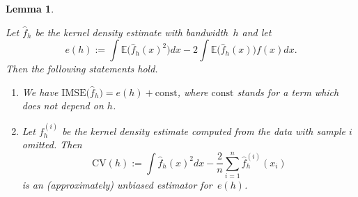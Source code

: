 \documentclass[
  a4paper,
]{article}
\newtheorem{lemma}{Lemma}[section]
\theoremstyle{definition}
\theoremstyle{definition}
\theoremstyle{definition}
\theoremstyle{definition}
\theoremstyle{remark}
\begin{document}
\begin{lemma}
\protect\hypertarget{lem:KDE-XV}{}\label{lem:KDE-XV}

Let \(\hat f_h\) be the kernel density estimate with bandwidth~\(h\)
and let
\begin{equation*}
  e(h)
  := \int \mathbb{E}\bigl( \hat f_h(x)^2 \bigr) dx - 2 \int \mathbb{E}\bigl( \hat f_h(x) \bigr) f(x) dx.
\end{equation*}
Then the following statements hold.

\begin{enumerate}
\def\labelenumi{(\alph{enumi})}
\item
  We have
  \(\mathrm{IMSE}\bigl( \hat f_h \bigr) = e(h) + \mathrm{const}\),
  where \(\mathrm{const}\) stands for a term which does not depend on \(h\).
\item
  Let \(f_h^{(i)}\) be the kernel density estimate computed from the data
  with sample \(i\) omitted.
  Then
  \begin{equation*}
    \mathrm{CV}(h)
    := \int \hat f_h(x)^2 dx - \frac{2}{n}\sum_{i=1}^n \hat f_h^{(i)}(x_i)
  \end{equation*}
  is an (approximately) unbiased estimator for~\(e(h)\).
\end{enumerate}

\end{lemma}
\end{document}
